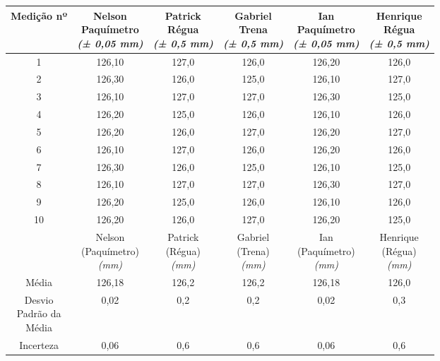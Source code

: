 \documentclass{article}
\begin{document}
\begin{table}[h!]
\centering
\begin{tabular}{c c c c c c }
\toprule
Medição nº & \shortstack{Nelson\\Paquímetro\\\textit{(± 0,05 mm)}} & \shortstack{Patrick\\Régua\\\textit{(± 0,5 mm)}} & \shortstack{Gabriel\\Trena\\\textit{(± 0,5 mm)}} & \shortstack{Ian\\Paquímetro\\\textit{(± 0,05 mm)}} & \shortstack{Henrique\\Régua\\\textit{(± 0,5 mm)}}\\
\midrule
1 & 126,10 & 127,0 & 126,0 & 126,20 & 126,0\\
2 & 126,30 & 126,0 & 125,0 & 126,10 & 127,0\\
3 & 126,10 & 127,0 & 127,0 & 126,30 & 125,0\\
4 & 126,20 & 125,0 & 126,0 & 126,10 & 126,0\\
5 & 126,20 & 126,0 & 127,0 & 126,20 & 127,0\\
6 & 126,10 & 127,0 & 126,0 & 126,20 & 126,0\\
7 & 126,30 & 126,0 & 125,0 & 126,10 & 125,0\\
8 & 126,10 & 127,0 & 127,0 & 126,30 & 127,0\\
9 & 126,20 & 125,0 & 126,0 & 126,10 & 126,0\\
10 & 126,20 & 126,0 & 127,0 & 126,20 & 125,0\\
\midrule
&\shortstack{Nelson\\(Paquímetro)\\\textit{(mm)}} & \shortstack{Patrick\\(Régua)\\\textit{(mm)}} & \shortstack{Gabriel\\(Trena)\\\textit{(mm)}} & \shortstack{Ian\\(Paquímetro)\\\textit{(mm)}} & \shortstack{Henrique\\(Régua)\\\textit{(mm)}}\\
\midrule
Média & 126,18 & 126,2 & 126,2 & 126,18 & 126,0\\[3pt]
\shortstack{Desvio\\Padrão da\\Média} & 0,02 & 0,2 & 0,2 & 0,02 & 0,3\\[3pt]
Incerteza & 0,06 & 0,6 & 0,6 & 0,06 & 0,6\\
\bottomrule
\end{tabular}
\end{table}
\end{document}
